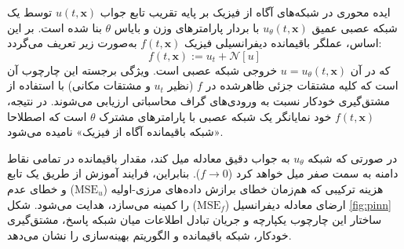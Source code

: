 ایده محوری در شبکه‌های آگاه از فیزیک بر پایه تقریب تابع جواب $u(t,\mathbf{x})$ توسط یک شبکه عصبی عمیق $u_\theta(t,\mathbf{x})$ با بردار پارامترهای وزن و بایاس $\theta$ بنا شده است. بر این اساس، عملگر باقیمانده دیفرانسیلی فیزیک $f(t,\mathbf{x})$ به‌صورت زیر تعریف می‌گردد:
\begin{equation}
f(t,\mathbf{x}) := u_t + \mathcal{N}[u]
\label{eq:residual}
\end{equation}
که در آن $u = u_\theta(t,\mathbf{x})$ خروجی شبکه عصبی است. ویژگی برجسته این چارچوب آن است که کلیه مشتقات جزئی ظاهرشده در $f$ (نظیر $u_t$ و مشتقات مکانی) با استفاده از مشتق‌گیری خودکار نسبت به ورودی‌های گراف محاسباتی ارزیابی می‌شوند. در نتیجه، $f(t,\mathbf{x})$ خود نمایانگر یک شبکه عصبی با پارامترهای مشترک $\theta$ است که اصطلاحا «شبکه باقیمانده آگاه از فیزیک» نامیده می‌شود.

در صورتی که شبکه $u_\theta$ به جواب دقیق معادله میل کند، مقدار باقیمانده در تمامی نقاط دامنه به سمت صفر میل خواهد کرد ($f \to 0$). بنابراین، فرایند آموزش از طریق یک تابع هزینه ترکیبی که هم‌زمان خطای برازش داده‌های مرزی-اولیه ($\mathrm{MSE}_u$) و خطای عدم ارضای معادله دیفرانسیل ($\mathrm{MSE}_f$) را کمینه می‌سازد، هدایت می‌شود. شکل \ref{fig:pinn} ساختار این چارچوب یکپارچه و جریان تبادل اطلاعات میان شبکه پاسخ، مشتق‌گیری خودکار، شبکه باقیمانده و الگوریتم بهینه‌سازی را نشان می‌دهد.

